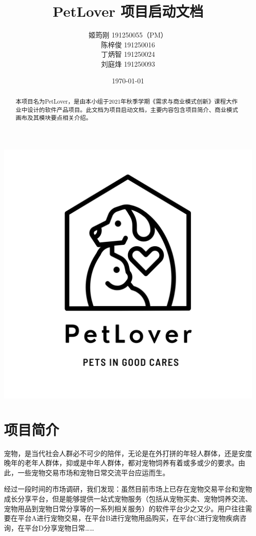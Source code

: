 \documentclass[a4paper]{ctexart}
\title{\Huge PetLover 项目启动文档}
\author{
  姬筠刚 191250055（PM）\\
  陈梓俊 191250016\\
  丁炳智 191250024\\
  刘庭烽 191250093\\
}
\date{\today}
\begin{document}
\maketitle

\centerline{\includegraphics[]{logo.png}}

\newpage

\begin{abstract}
  本项目名为PetLover，是由本小组于2021年秋季学期《需求与商业模式创新》课程大作业中设计的软件产品项目。此文档为项目启动文档，主要内容包含项目简介、商业模式画布及其模块要点相关介绍。
\end{abstract}



\tableofcontents

\newpage

\setlength{\parskip}{1em}


\section{项目简介}
宠物，是当代社会人群必不可少的陪伴，无论是在外打拼的年轻人群体，还是安度晚年的老年人群体，抑或是中年人群体，都对宠物饲养有着或多或少的要求。由此，一些宠物交易市场和宠物日常交流平台应运而生。

经过一段时间的市场调研，我们发现：虽然目前市场上已存在宠物交易平台和宠物成长分享平台，但是能够提供一站式宠物服务（包括从宠物买卖、宠物饲养交流、宠物用品到宠物日常分享等的一系列相关服务）的软件平台少之又少。用户往往需要在平台A进行宠物交易，在平台B进行宠物用品购买，在平台C进行宠物疾病咨询，在平台D分享宠物日常……
\end{document}
